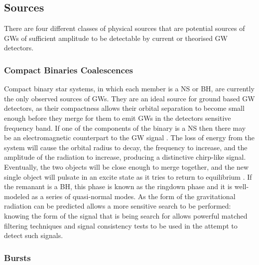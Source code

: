\documentclass[binding=0.6cm, LaM]{sapthesis}
\begin{document}
\subsection{Sources}
\label{sec:sources}

	There are four different classes of physical sources 
	that are potential sources of GWs 
	of sufficient amplitude to be detectable 
	by current or theorised GW detectors. 

\subsubsection{Compact Binaries Coalescences}

	Compact binary star systems, in which each member is a NS or BH, 
	are currently the only observed sources of GWs.
	They are an ideal source for ground based GW detectors, 
	as their compactness allows their orbital separation to become 
	small enough before they merge for them to emit GWs in the detectors sensitive frequency band.
	If one of the components of the binary is a NS 
	then there may be an electromagnetic counterpart to the GW signal \cite{20}. 
	The loss of energy from the system will cause the orbital radius to decay, 
	the frequency to increase, and the amplitude of the radiation to increase, 
	producing a distinctive chirp-like signal. 
	Eventually, the two objects will be close enough to merge together, 
	and the new single object will pulsate in an excite state as it tries to return to equilibrium \cite{21}. 
	If the remanant is a BH, this phase is known as the ringdown phase and it is well-modeled as a series of quasi-normal modes. 
	As the form of the gravitational radiation can be predicted allows 
	a more sensitive search to be performed: knowing the form of the signal 
	that is being search for allows powerful matched filtering techniques 
	and signal consistency tests to be used in the attempt to detect such signals.


\subsubsection{Bursts}
\end{document}
